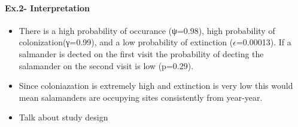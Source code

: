 \documentclass[
]{article}
\begin{document}
\hypertarget{ex.2--interpretation}{%
\paragraph{\texorpdfstring{\textbf{Ex.2-
Interpretation}}{Ex.2- Interpretation}}\label{ex.2--interpretation}}

\begin{itemize}
\item
  There is a high probability of occurance (ψ=0.98), high probability of
  colonization(γ=0.99), and a low probability of extinction
  (\(\epsilon\)=0.00013). If a salmander is dected on the first visit
  the probability of decting the salamander on the second visit is low
  (p=0.29).
\item
  Since coloniazation is extremely high and extinction is very low this
  would mean salamanders are occupying sites consistently from
  year-year.
\item
  Talk about study design
\end{itemize}
\end{document}

